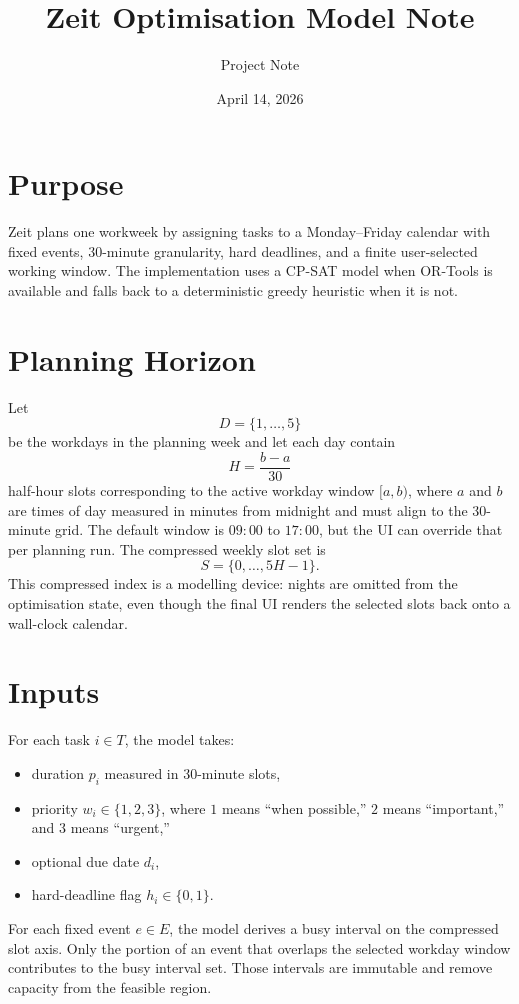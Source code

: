 \documentclass[11pt]{article}
\title{Zeit Optimisation Model Note}
\author{Project Note}
\date{April 14, 2026}
\begin{document}
\maketitle

\section{Purpose}
Zeit plans one workweek by assigning tasks to a Monday--Friday calendar with fixed events,
30-minute granularity, hard deadlines, and a finite user-selected working window. The
implementation uses a CP-SAT model when OR-Tools is available and falls back to a deterministic
greedy heuristic when it is not.

\section{Planning Horizon}
Let
\[
D = \{1, \dots, 5\}
\]
be the workdays in the planning week and let each day contain
\[
H = \frac{b-a}{30}
\]
half-hour slots corresponding to the active workday window \([a,b)\), where \(a\) and \(b\) are
times of day measured in minutes from midnight and must align to the 30-minute grid. The
default window is \(09{:}00\) to \(17{:}00\), but the UI can override that per planning run.
The compressed weekly
slot set is
\[
S = \{0, \dots, 5H - 1\}.
\]
This compressed index is a modelling device: nights are omitted from the optimisation state,
even though the final UI renders the selected slots back onto a wall-clock calendar.

\section{Inputs}
For each task \(i \in T\), the model takes:
\begin{itemize}
  \item duration \(p_i\) measured in 30-minute slots,
  \item priority \(w_i \in \{1,2,3\}\), where \(1\) means ``when possible,'' \(2\) means ``important,'' and \(3\) means ``urgent,''
  \item optional due date \(d_i\),
  \item hard-deadline flag \(h_i \in \{0,1\}\).
\end{itemize}

For each fixed event \(e \in E\), the model derives a busy interval on the compressed slot axis.
Only the portion of an event that overlaps the selected workday window contributes to the busy
interval set. Those intervals are immutable and remove capacity from the feasible region.
\end{document}

